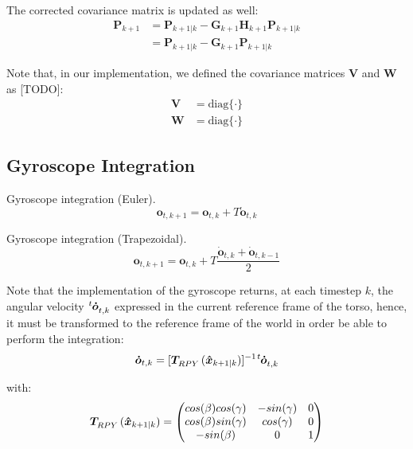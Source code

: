 \documentclass[a4paper]{article}
\begin{document}
The corrected covariance matrix is updated as well:
\begin{align}
    \bm{P}_{k+1} &= \bm{P}_{k+1|k} - \bm{G}_{k+1} \bm{H}_{k+1} \bm{P}_{k+1|k} \\
        &= \bm{P}_{k+1|k} - \bm{G}_{k+1} \bm{P}_{k+1|k}
\end{align}

Note that, in our implementation, we defined the covariance
matrices $\bm{V}$ and $\bm{W}$ as [TODO]:
\begin{align}
    \bm{V} &= \text{diag}\{\cdot\} \\
    \bm{W} &= \text{diag}\{\cdot\}
\end{align}

\subsection{Gyroscope Integration}
\label{subsec:gyro-integration}
Gyroscope integration (Euler).
\begin{equation}
    \bm{o}_{t,k+1} = \bm{o}_{t,k} + T \bm{\dot{o}}_{t,k}
\end{equation}

Gyroscope integration (Trapezoidal).
\begin{equation}
    \bm{o}_{t,k+1} = \bm{o}_{t,k} + T \frac{\bm{\dot{o}}_{t,k} + \bm{\dot{o}}_{t,k-1}}{2}
\end{equation}

Note that the implementation of the gyroscope returns, at each
timestep $k$, the angular velocity
$\tensor[^t]{\bm{\dot{o}}}{_{t,k}}$ expressed in the current
reference frame of the torso, hence, it must be transformed to
the reference frame of the world in order be able to perform the
integration:
\begin{equation}
    \bm{\dot{o}}_{t,k} = [\tensor[]{\bm{T}}{_{RPY}}(\bm{\hat{x}}_{k+1|k})]^{-1} \tensor[^t]{\bm{\dot{o}}}{_{t,k}}
\end{equation}

\noindent with:
\begin{equation}
    \tensor[]{\bm{T}}{_{RPY}}(\bm{\hat{x}}_{k+1|k}) =
    \begin{pmatrix}
        cos(\beta) cos(\gamma) & -sin(\gamma) & 0 \\
        cos(\beta) sin(\gamma) &  cos(\gamma) & 0 \\
        -sin(\beta) & 0 & 1
    \end{pmatrix}
\end{equation}
\end{document}

